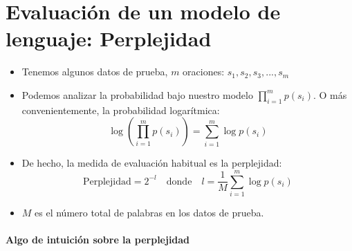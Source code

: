 \section{Evaluación de un modelo de lenguaje: Perplejidad}

\begin{itemize}
    \item Tenemos algunos datos de prueba, $m$ oraciones: $s_1, s_2, s_3, ..., s_m$
    \item Podemos analizar la probabilidad bajo nuestro modelo $\prod_{i=1}^{m} p(s_i)$. O más convenientemente, la probabilidad logarítmica:
    \[
        \log \left( \prod_{i=1}^{m} p(s_i) \right) = \sum_{i=1}^{m} \log p(s_i)
    \]
    \item De hecho, la medida de evaluación habitual es la perplejidad:
    \[
        \text{Perplejidad} = 2^{-l} \quad \text{donde} \quad l = \frac{1}{M} \sum_{i=1}^{m} \log p(s_i)
    \]
    \item $M$ es el número total de palabras en los datos de prueba.
\end{itemize}

\paragraph{Algo de intuición sobre la perplejidad}

